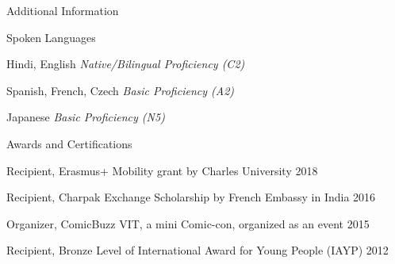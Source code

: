 
\begin{rSection}{\faInfoCircle \hspace{0.5mm} Additional Information}
 
    \begin{rSubsection}{\faVolumeUp \hspace{0.5mm} Spoken Languages}{}{}{}
        \item Hindi, English \hfill {\em Native/Bilingual Proficiency (C2)}
        \item Spanish, French, Czech \hfill {\em Basic Proficiency (A2)}
        \item Japanese \hfill {\em Basic Proficiency (N5)}
    \end{rSubsection}

    \begin{rSubsection}{\faTrophy \hspace{0.5mm} Awards and Certifications}{}{}
    
        \item Recipient, Erasmus+ Mobility grant by Charles University
            \hfill {2018}
        
        \item Recipient, Charpak Exchange Scholarship by French Embassy in India 
            \hfill {2016}
        
        \item {Organizer, ComicBuzz VIT, a mini Comic-con, organized as an 
            event} \hfill {2015}
        
        \item Recipient, Bronze Level of International Award for Young People (IAYP)
            \hfill {2012}
    
    \end{rSubsection}

\end{rSection}
